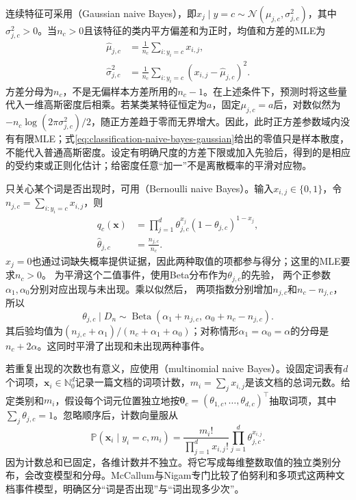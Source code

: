 连续特征可采用（Gaussian naive Bayes），即$x_j\mid y=c\sim\mathcal{N}(\mu_{j,c},\sigma_{j,c}^{2})$，其中$\sigma_{j,c}^{2}>0$。当$n_c>0$且该特征的类内平方偏差和为正时，均值和方差的MLE为
\begin{equation}
  \label{eq:classification-naive-bayes-gaussian}
  \begin{aligned}
    \hat\mu_{j,c}
      &=\frac{1}{n_c}\sum_{i:y_i=c}x_{i,j},\\
    \hat\sigma_{j,c}^{2}
      &=\frac{1}{n_c}\sum_{i:y_i=c}
        (x_{i,j}-\hat\mu_{j,c})^2.
  \end{aligned}
\end{equation}
方差分母为$n_c$，不是无偏样本方差所用的$n_c-1$。在上述条件下，预测时将这些量代入一维高斯密度后相乘。若某类某特征恒定为$a$，固定$\mu_{j,c}=a$后，对数似然为$-n_c\log(2\pi\sigma_{j,c}^{2})/2$，随正方差趋于零而无界增大。因此，此时正方差参数域内没有有限MLE；式\eqref{eq:classification-naive-bayes-gaussian}给出的零值只是样本散度，不能代入普通高斯密度。设定有明确尺度的方差下限或加入先验后，得到的是相应的受约束或正则化估计；给密度任意“加一”不是离散概率的平滑对应物。

只关心某个词是否出现时，可用（Bernoulli naive Bayes）。输入$x_{i,j}\in\{0,1\}$，令$n_{j,c}=\sum_{i:y_i=c}x_{i,j}$，则
\begin{equation}
  \label{eq:classification-naive-bayes-bernoulli}
  \begin{aligned}
    q_c(\bm{x})
      &=\prod_{j=1}^{d}
        \theta_{j,c}^{x_j}(1-\theta_{j,c})^{1-x_j},\\
    \hat\theta_{j,c}&=\frac{n_{j,c}}{n_c}.
  \end{aligned}
\end{equation}
$x_j=0$也通过词缺失概率提供证据，因此两种取值的项都参与得分；这里的MLE要求$n_c>0$。
为平滑这个二值事件，使用Beta分布作为$\theta_{j,c}$的先验，
两个正参数$\alpha_1,\alpha_0$分别对应出现与未出现。乘以似然后，
两项指数分别增加$n_{j,c}$和$n_c-n_{j,c}$，所以
\[
  \theta_{j,c}\mid D_n
  \sim\operatorname{Beta}
    (\alpha_1+n_{j,c},\,\alpha_0+n_c-n_{j,c}).
\]
其后验均值为$(n_{j,c}+\alpha_1)/(n_c+\alpha_1+\alpha_0)$；对称情形$\alpha_1=\alpha_0=\alpha$的分母是$n_c+2\alpha$。这同时平滑了出现和未出现两种事件。

若重复出现的次数也有意义，应使用（multinomial naive Bayes）。设固定词表有$d$个词项，$\bm{x}_i\in\mathbb{N}_0^d$记录一篇文档的词项计数，$m_i=\sum_jx_{i,j}$是该文档的总词元数。给定类别和$m_i$，假设每个词元位置独立地按$\bm{\theta}_c=(\theta_{1,c},\ldots,\theta_{d,c})^{\top}$抽取词项，其中$\sum_j\theta_{j,c}=1$。忽略顺序后，计数向量服从
\begin{equation}
  \label{eq:classification-naive-bayes-multinomial}
  \mathbb{P}(\bm{x}_i\mid y_i=c,m_i)
  =\frac{m_i!}{\prod_{j=1}^{d}x_{i,j}!}
    \prod_{j=1}^{d}\theta_{j,c}^{x_{i,j}}.
\end{equation}
因为计数总和已固定，各维计数并不独立。将它写成每维整数取值的独立类别分布，会改变模型和分母。McCallum与Nigam专门比较了伯努利和多项式这两种文档事件模型，明确区分“词是否出现”与“词出现多少次”。

